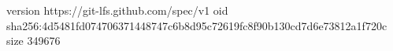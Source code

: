 version https://git-lfs.github.com/spec/v1
oid sha256:4d5481fd074706371448747c6b8d95c72619fc8f90b130cd7d6e73812a1f720c
size 349676
